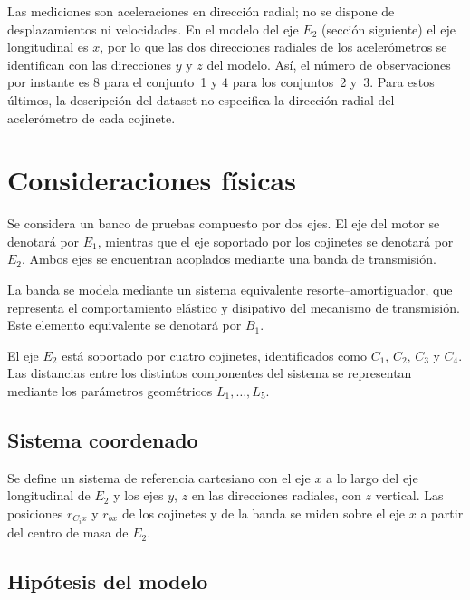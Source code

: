 Las mediciones son aceleraciones en dirección radial; no se dispone de desplazamientos ni velocidades. 
En el modelo del eje $E_2$ (sección siguiente) el eje longitudinal es $x$, por lo que las dos direcciones 
radiales de los acelerómetros se identifican con las direcciones $y$ y $z$ del modelo. Así, el número de 
observaciones por instante es $8$ para el conjunto~1 y $4$ para los conjuntos~2 y~3. Para estos últimos, la 
descripción del dataset no especifica la dirección radial del acelerómetro de cada cojinete.

\section{Consideraciones físicas}

Se considera un banco de pruebas compuesto por dos ejes. El eje del motor se denotará por $E_1$, mientras que el eje
 soportado por los cojinetes se denotará por $E_2$. Ambos ejes se encuentran acoplados mediante una banda de transmisión.

La banda se modela mediante un sistema equivalente resorte--amortiguador, que representa el comportamiento elástico y 
disipativo del mecanismo de transmisión. Este elemento equivalente se denotará por $B_1$.

El eje $E_2$ está soportado por cuatro cojinetes, identificados como $C_1$, $C_2$, $C_3$ y $C_4$. Las distancias entre los 
distintos componentes del sistema se representan mediante los parámetros geométricos $L_1,\ldots,L_5$.

\subsection{Sistema coordenado}

Se define un sistema de referencia cartesiano con el eje $x$ a lo largo del eje longitudinal de $E_2$ y los ejes $y$, $z$ en 
las direcciones radiales, con $z$ vertical. Las posiciones $r_{C_ix}$ y $r_{bx}$ de los cojinetes y de la banda se miden sobre el eje $x$ a partir del centro de masa de $E_2$.

\subsection{Hipótesis del modelo}

